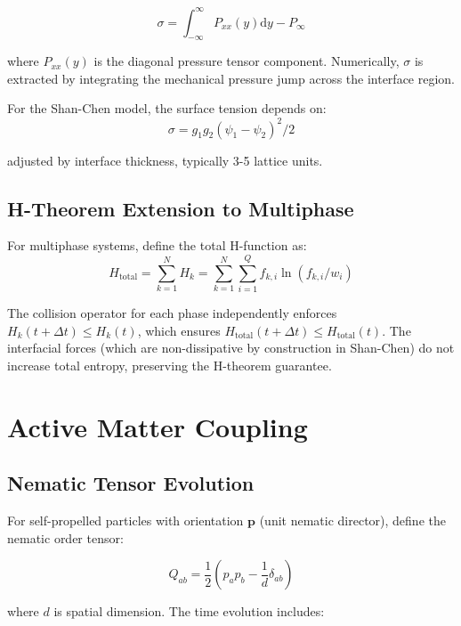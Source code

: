\begin{equation}
\sigma = \int_{-\infty}^{\infty} P_{xx}(y) \mathrm{d}y - P_{\infty}
\end{equation}

where $P_{xx}(y)$ is the diagonal pressure tensor component. Numerically, $\sigma$ is extracted by integrating the mechanical pressure jump across the interface region.

For the Shan-Chen model, the surface tension depends on:
\begin{equation}
\sigma = g_1 g_2 \left(\psi_1 - \psi_2\right)^2 / 2
\end{equation}

adjusted by interface thickness, typically 3-5 lattice units.

\subsection{H-Theorem Extension to Multiphase}

For multiphase systems, define the total H-function as:
\begin{equation}
H_{\mathrm{total}} = \sum_{k=1}^{N} H_k = \sum_{k=1}^{N} \sum_{i=1}^{Q} f_{k,i} \ln(f_{k,i}/w_i)
\end{equation}

The collision operator for each phase independently enforces $H_k(t+\Delta t) \leq H_k(t)$, which ensures $H_{\mathrm{total}}(t+\Delta t) \leq H_{\mathrm{total}}(t)$. The interfacial forces (which are non-dissipative by construction in Shan-Chen) do not increase total entropy, preserving the H-theorem guarantee.

\section{Active Matter Coupling}

\subsection{Nematic Tensor Evolution}

For self-propelled particles with orientation $\mathbf{p}$ (unit nematic director), define the nematic order tensor:

\begin{equation}
Q_{ab} = \frac{1}{2}\left(p_a p_b - \frac{1}{d}\delta_{ab}\right)
\end{equation}

where $d$ is spatial dimension. The time evolution includes:

